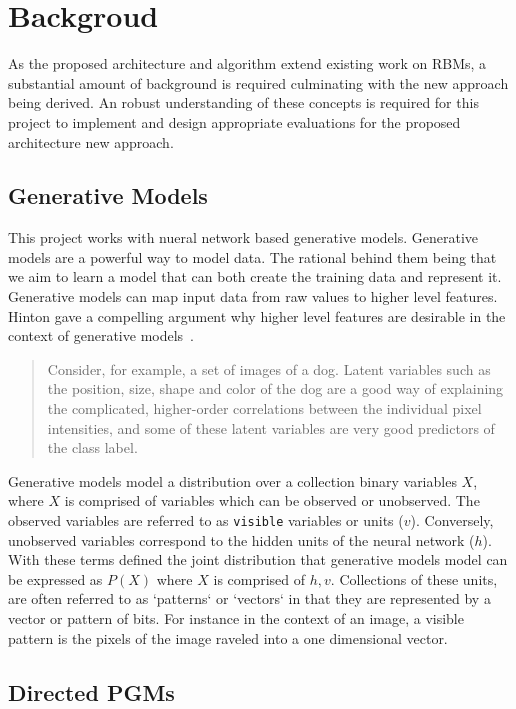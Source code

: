 \chapter{Backgroud}
As the proposed architecture and algorithm extend existing work on RBMs, a substantial amount of background is required culminating with the new approach being derived. An robust understanding of these concepts is required for this project to implement and design appropriate evaluations for the proposed architecture new approach.

\section{Generative Models}

This project works with nueral network based generative models.
Generative models are a powerful way to model data. The rational behind them being that we aim to learn a model that can both create the training data and represent it. Generative models can map input data from raw values to higher level features. Hinton gave a compelling argument why higher level features are desirable in the context of generative models~\cite{hinton:32723:vv}. \begin{quote} Consider, for example, a set of images of a dog. Latent variables such as the position, size, shape and color of the dog are a good way of explaining the complicated, higher-order correlations between the individual pixel intensities, and some of these latent variables are very good predictors of the class label.\end{quote}

Generative models model a distribution over a collection binary variables $X$, where $X$ is comprised of variables which can be observed or unobserved. The observed variables are referred to as \texttt{visible} variables or units ($v$). Conversely, unobserved variables correspond to the hidden units of the neural network ($h$). With these terms defined the joint distribution that generative models model can be expressed as $P(X)$ where $X$ is comprised of $h,v$. Collections of these units, are often referred to as `patterns` or `vectors` in that they are represented by a vector or pattern of bits. For instance in the context of an image, a visible pattern is the pixels of the image raveled into a one dimensional vector.

\section{Directed PGMs}

